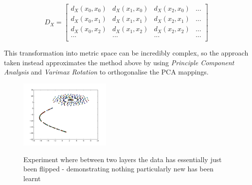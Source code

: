 \documentclass[a4paper,11pt,titlepage]{article}
\begin{document}
		$$
		D_X = \left[\begin{array}{cccc} 
		  d_X(x_0, x_0) & d_X(x_1, x_0) & d_X(x_2, x_0) & ... \\
		  d_X(x_0, x_1) & d_X(x_1, x_1) & d_X(x_2, x_1) & ... \\
		  d_X(x_0, x_2) & d_X(x_1, x_2) & d_X(x_2, x_2) & ... \\
		  ... & ... & ... & ... \\ 
		\end{array} \right]
		$$
		
		This transformation into metric space can be incredibly complex, so the approach taken instead approximates the method above by using \textit{Principle Component Analysis} and \textit{Varimax Rotation} to orthogonalise the PCA mappings.
		
		\begin{figure}[H]
    			\qquad
    			{{\includegraphics[width=0.4\textwidth]
    				{img/sne_plot_E2_L3_rotation.png} 
    			}}%
    			\caption{Experiment where between two layers the data has essentially just been flipped - demonstrating nothing particularly new has been learnt}%
		\end{figure}
\end{document}
